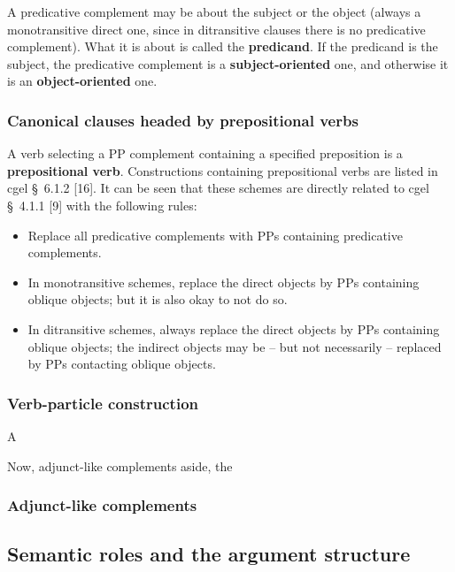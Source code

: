 \documentclass{article}
\newcommand*{\citesec}[1]{\S~{#1}}
\newcommand*{\concept}[1]{\textbf{#1}}
\begin{document}
A predicative complement may be about the subject or the object 
(always a monotransitive direct one, since in ditransitive clauses there is no predicative complement).
What it is about is called the \concept{predicand}.
If the predicand is the subject, the predicative complement is a \concept{subject-oriented} one,
and otherwise it is an \concept{object-oriented} one.

\subsubsection{Canonical clauses headed by prepositional verbs}

A verb selecting a PP complement containing a specified preposition is a \concept{prepositional verb}.
Constructions containing prepositional verbs are listed in \ac{cgel} \citesec{6.1.2} [16].
It can be seen that these schemes are directly related to \ac{cgel} \citesec{4.1.1} [9]
with the following rules:
\begin{itemize}
    \item Replace all predicative complements with PPs containing predicative complements.
    \item In monotransitive schemes, replace the direct objects by PPs containing oblique objects; 
    but it is also okay to not do so.
    \item In ditransitive schemes, always replace the direct objects by PPs containing oblique objects;
    the indirect objects may be -- but not necessarily -- replaced by PPs contacting oblique objects.
\end{itemize}

\subsubsection{Verb-particle construction}

A 

Now, adjunct-like complements aside, 
the 

\subsubsection{Adjunct-like complements}

\subsection{Semantic roles and the argument structure}

\end{document}
